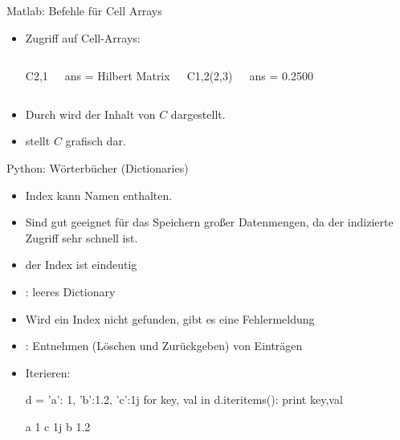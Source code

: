 \documentclass[hyperref={xetex}]{beamer}
\begin{document}
%
%
\begin{frame}[fragile]{Matlab: Befehle für Cell Arrays}
\begin{itemize}
\item Zugriff auf Cell-Arrays:\\ 
\begin{columns}[c]
\begin{matlabin} 
C{2,1}
\end{matlabin}
\begin{matlab}
ans =
Hilbert Matrix
\end{matlab}
\begin{matlabin}
C{1,2}(2,3)
\end{matlabin}
\begin{matlab}
ans =
    0.2500
\end{matlab}
\end{columns}
\item Durch  wird der Inhalt von $C$ dargestellt.
\item {} stellt $C$ grafisch dar.
\end{itemize}
\end{frame}

\begin{frame}[fragile]{Python: Wörterbücher (Dictionaries)}
\begin{itemize}
\item Index kann Namen enthalten.
\item Sind gut geeignet für das Speichern großer Datenmengen, da der indizierte Zugriff sehr schnell ist. 
\item der Index ist eindeutig
\item {}: leeres Dictionary
\item Wird ein Index nicht gefunden, gibt es eine Fehlermeldung
\item {}: Entnehmen (Löschen und Zurückgeben) von Einträgen 
\item Iterieren:
\begin{pyin}
d = {'a': 1, 'b':1.2, 'c':1j}
for key, val in d.iteritems():
  print key,val        
\end{pyin}
\begin{pyout}
a 1
c 1j
b 1.2
\end{pyout}
\end{itemize}
\end{frame}
\end{document}
